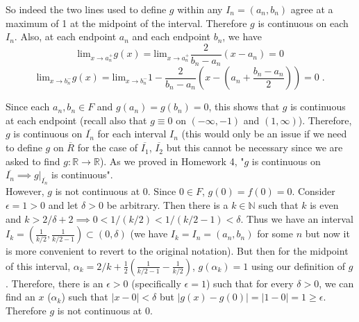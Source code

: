 \documentclass[a4paper]{article}
\begin{document}
So indeed the two lines used to define $g$ within any $I_n = (a_n,b_n)$ agree at a maximum of 1 at the midpoint of the interval. Therefore $g$ is continuous on each $I_n$. Also, at each endpoint $a_n$ and each endpoint $b_n$, we have
$$\text{lim}_{x \rightarrow a_n^+} g(x) = \text{lim}_{x\rightarrow a_n^+} \frac{2}{b_n - a_n}(x-a_n) = 0$$
$$ \text{lim}_{x\rightarrow b_n^-} g(x) = \text{lim}_{x\rightarrow b_n^-} 1 - \frac{2}{b_n - a_n}\left(x- (a_n + \frac{b_n-a_n}{2})\right) = 0 \;.$$

Since each $a_n,b_n \in F$ and $g(a_n) = g(b_n) = 0$, this shows that $g$ is continuous at each endpoint (recall also that $g \equiv 0$ on $(-\infty,-1)$ and $(1,\infty)$). Therefore, $g$ is continuous on $\overline{I_n}$ for each interval $I_n$ (this would only be an issue if we need to define $g$ on $\overline{R}$ for the case of $\overline{I_1}$, $\overline{I_2}$ but  this cannot be necessary since we are asked to find $g: \mathbb{R} \rightarrow \mathbb{R}$). As we proved in Homework 4, "$g$ is continuous on $\overline{I_n} \implies g\rvert_{\overline{I_n}}$ is continuous". \\

However, $g$ is not continuous at 0. Since $0 \in F$, $g(0) = f(0) = 0$. Consider $\epsilon = 1>0$ and let $\delta >0$ be arbitrary. Then there is a $k \in \mathbb{N}$ such that $k$ is even and  $k > 2/\delta + 2 \implies 0< 1/(k/2)< 1/(k/2 - 1) < \delta$. Thus we have an interval $I_k = \left(\frac{1}{k/2}, \frac{1}{k/2 - 1}\right) \subset (0,\delta)$ (we have $I_k = I_n= (a_n,b_n)$ for some $n$ but now it is more convenient to revert to the original notation). But then for the midpoint of this interval, $\alpha_k = 2/k + \frac{1}{2}\left(\frac{1}{k/2 - 1} - \frac{1}{k/2}\right)$, $g(\alpha_k)= 1$ using our definition of $g$. Therefore, there is an $\epsilon > 0$ (specifically $\epsilon = 1$) such that for every $\delta > 0$, we can find an $x$ ($\alpha_k$) such that $|x - 0| < \delta$ but $|g(x) - g(0)| = |1-0| = 1 \geq \epsilon$. Therefore $g$ is not continuous at $0$.\\
\end{document}
